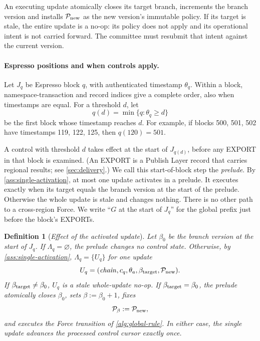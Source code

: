 \documentclass[11pt,a4paper]{article}
\newcommand{\defterm}[1]{\textcolor{rrBlue}{\textit{#1}}}
\newtheorem{definition}{Definition}[section]
\begin{document}
An executing update atomically closes its target branch, increments the
branch version and installs $\mathcal P_{\rm new}$ as the new version's
immutable policy.  If its target is stale, the entire update is a no-op:
its policy does not apply and its operational intent is not carried
forward. The committee must resubmit that intent against the current
version.

\paragraph{Espresso positions and when controls apply.}
Let $J_q$ be Espresso block $q$, with authenticated timestamp $\theta_q$.
Within a block, namespace-transaction and record indices give a complete
order, also when timestamps are equal. For a threshold $d$, let
\[
 q(d)=\min\{q:\theta_q\ge d\}
\]
be the first block whose timestamp reaches $d$. For example, if blocks
500, 501, 502 have timestamps 119, 122, 125, then $q(120)=501$.

A control with threshold $d$ takes effect at the start of $J_{q(d)}$,
before any EXPORT in that block is examined. (An EXPORT is a Publish
Layer record that carries regional results; see \cref{sec:delivery}.) We
call this start-of-block step the \defterm{prelude}. By
\cref{ass:single-activation}, at most one update activates in a prelude.
It executes exactly when its target equals the branch version at the
start of the prelude. Otherwise the whole update is stale and changes
nothing. There is no other path to a cross-region Force. We write ``$G$
at the start of $J_q$'' for the global prefix just before the block's
EXPORTs.

\begin{definition}[\defterm{Effect of the activated update}]
\label{def:control-effect}
Let $\beta_0$ be the branch version at the start of $J_q$. If
$\Lambda_q=\varnothing$, the prelude changes no control state. Otherwise,
by \cref{ass:single-activation}, $\Lambda_q=\{U_q\}$ for one update
\[
 U_q=(\mathit{chain},c_q,\theta_a,\beta_{\rm target},\mathcal P_{\rm new}).
\]
If $\beta_{\rm target}\ne\beta_0$, $U_q$ is a stale whole-update no-op.
If $\beta_{\rm target}=\beta_0$, the prelude atomically closes $\beta_0$,
sets $\beta:=\beta_0+1$, fixes
\[
 \mathcal P_{\beta}:=\mathcal P_{\rm new},
\]
and executes the Force transition of \cref{alg:global-rule}. In either
case, the single update advances the processed control cursor exactly
once.
\end{definition}
\end{document}
